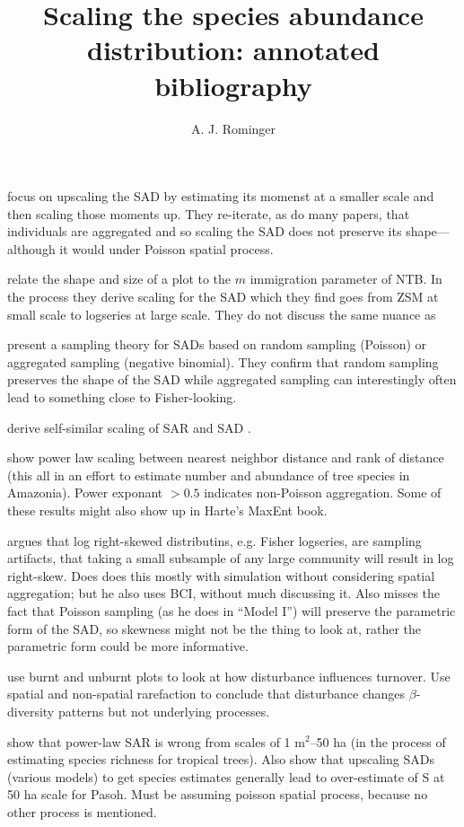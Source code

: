\documentclass[12pt]{article}
\title{Scaling the species abundance distribution: annotated
  bibliography}
\author{A. J. Rominger}
\begin{document}
\maketitle

\citet{bordaDeAgua2012} focus on upscaling the SAD by estimating its
momenst at a smaller scale and then scaling those moments up.  They
re-iterate, as do many papers, that individuals are aggregated and so
scaling the SAD does not preserve its shape---although it would under
Poisson spatial process.

\citet{chisholm2009} relate the shape and size of a plot to the $m$
immigration parameter of NTB. In the process they derive scaling for
the SAD which they find goes from ZSM at small scale to logseries at
large scale. They do not discuss the same nuance as
\citet{rosindell2013}

\citet{green2007} present a sampling theory for SADs based on random
sampling (Poisson) or aggregated sampling (negative binomial). They
confirm that random sampling preserves the shape of the SAD while
aggregated sampling can interestingly often lead to something close to
Fisher-looking.

\citet{harte1999} derive self-similar scaling of SAR and SAD
\citep[but see][who says they did it wrong for SAD]{pueyo2006}.

\citet{hubbell2008} show power law scaling between nearest neighbor
distance and rank of distance (this all in an effort to estimate
number and abundance of tree species in Amazonia). Power exponant
$>0.5$ indicates non-Poisson aggregation.  Some of these results might
also show up in Harte's MaxEnt book.

\citet{mcgill2003} argues that log right-skewed distributins,
e.g. Fisher logseries, are sampling artifacts, that taking a small
subsample of any large community will result in log right-skew. Does
does this mostly with simulation without considering spatial
aggregation; but he also uses BCI, without much discussing it. Also
misses the fact that Poisson sampling (as he does in ``Model I'') will
preserve the parametric form of the SAD, so skewness might not be the
thing to look at, rather the parametric form could be more
informative.

\citet{myers2015} use burnt and unburnt plots to look at how
disturbance influences turnover. Use spatial and non-spatial
rarefaction to conclude that disturbance changes $\beta$-diversity
patterns but not underlying processes.

\citet{plotkin2000} show that power-law SAR is wrong from scales of 1
m$^2$--50 ha (in the process of estimating species richness for
tropical trees).  Also show that upscaling SADs (various models) to
get species estimates generally lead to over-estimate of S at 50 ha
scale for Pasoh.  Must be assuming poisson spatial process, because no
other process is mentioned.
\end{document}
